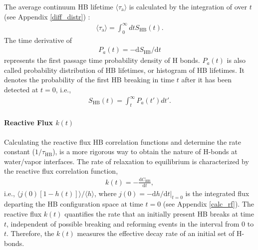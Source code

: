The average continuum HB lifetime $\langle \tau_{\mathrm{a}} \rangle$ is calculated by the integration of \SHB over $t$ (see Appendix \ref{diff_distr}) :  
\begin{eqnarray}
  \langle\tau_{\mathrm{a}}\rangle = \int_0^\infty dt S_{\text{HB}}(t).
\label{eq:calculate_hb_lifetime_from_s}
\end{eqnarray}
%
The time derivative of \SHB
\begin{eqnarray}
P_a(t) = -\text{d}S_{\text{HB}}/\text{d}t
\label{eq:P_1}
\end{eqnarray}
represents the first passage time probability density of H bonds. $P_a(t)$ is also called probability distribution of HB lifetimes, \cite{Sciortino1990prl,Krausche1992,FWS99,Voloshin2009} or histogram of HB lifetimes.\cite{Geiger1984,Stanley2000}
It denotes the probability of the first HB breaking in time $t$ after it has been detected at $t=0$, i.e.,
\begin{eqnarray}
S_{\text{HB}}(t)= \int_t^\infty P_a(t')dt'.
\label{eq:P_2}
\end{eqnarray}
%

\paragraph{Reactive Flux $k(t)$} 
Calculating the reactive flux HB correlation functions and determine the rate constant ($1/\tau_{\text{HB}}$),
is a more rigorous way to obtain the nature of H-bonds at water/vapor interfaces. \cite{AL00}
The rate of relaxation to equilibrium is characterized by the reactive flux correlation function, 
\begin{eqnarray}
k(t) = -\frac{\text{d}C_{\text{HB}}}{\text{d}t},
\label{eq:k}
\end{eqnarray}
i.e., $\langle j(0)[1-h(t)]\rangle/\langle h\rangle$,
where 
$j(0)=-\text{d}h/\text{d}t|_{t=0}$ 
is the integrated flux departing the HB configuration space at time $t=0$ (see Appendix \ref{calc_rf}).
The reactive flux $k(t)$ quantifies the rate that an initially present HB breaks at time $t$, 
independent of possible breaking and reforming events in the interval from 0 to $t$.
Therefore, the $k(t)$ measures the effective decay rate of an 
initial set of H-bonds. \cite{DC87,FWS00}

